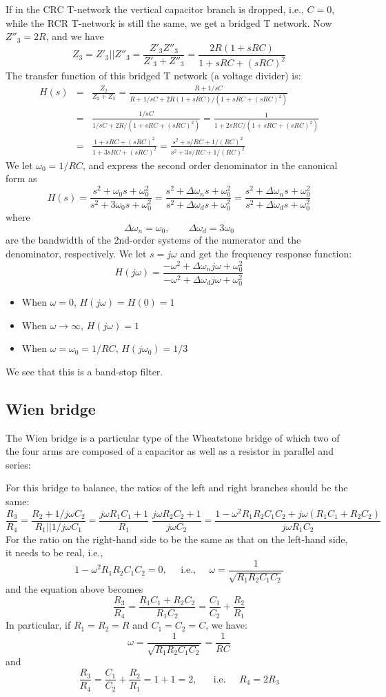 If in the CRC T-network the vertical capacitor branch is dropped, i.e.,
$C=0$, while the RCR T-network is still the same, we get a bridged T 
network. Now $Z''_3=2R$, and we have
\[
  Z_3=Z'_3||Z''_3=\frac{Z'_3 Z''_3}{Z'_3+Z''_3}
  =\frac{2R(1+sRC)}{1+sRC+(sRC)^2}
\]
The transfer function of this bridged T network (a voltage divider) is:
\begin{eqnarray}
H(s)&=&\frac{Z_2}{Z_2+Z_3}=\frac{R+1/sC}{R+1/sC+2R(1+sRC)/(1+sRC+(sRC)^2)}
\nonumber \\
&=&\frac{1/sC}{1/sC+2R/(1+sRC+(sRC)^2)}
=\frac{1}{1+2sRC/(1+sRC+(sRC)^2)}
\nonumber \\
&=&\frac{1+sRC+(sRC)^2}{1+3sRC+(sRC)^2}
=\frac{s^2+s/RC+1/(RC)^2}{s^2+3s/RC+1/(RC)^2}
\nonumber
\end{eqnarray}
We let $\omega_0=1/RC$, and express the second order denominator in the
canonical form as
\[
H(s)=\frac{s^2+\omega_0 s+\omega_0^2}{s^2+3\omega_0s+\omega_0^2}
=\frac{s^2+\Delta\omega_n s+\omega_0^2}{s^2+\Delta\omega_ds+\omega_0^2}
=\frac{s^2+\Delta\omega_n s+\omega_0^2}{s^2+\Delta\omega_ds+\omega_0^2}
\]
where 
\[
\Delta\omega_n=\omega_0,\;\;\;\;\;\;\;\Delta\omega_d=3\omega_0
\]
are the bandwidth of the 2nd-order systems of the numerator and the
denominator, respectively.
We let $s=j\omega$ and get the frequency response function:
\[
H(j\omega)=\frac{-\omega^2+\Delta\omega_n j\omega+\omega_0^2}{-\omega^2+\Delta\omega_dj\omega+\omega_0^2}
\]
\begin{itemize}
\item When $\omega=0$, $H(j\omega)=H(0)=1$
\item When $\omega\rightarrow \infty$, $H(j\omega)=1$
\item When $\omega=\omega_0=1/RC$, $H(j\omega_0)=1/3$
\end{itemize}
We see that this is a band-stop filter.


\subsection*{Wien bridge}


The Wien bridge is a particular type of the Wheatstone bridge of which
two of the four arms are composed of a capacitor as well as a resistor
in parallel and series:


For this bridge to balance, the ratios of the left and right branches
should be the same:
\[
\frac{R_3}{R_4}=\frac{R_2+1/j\omega C_2}{R_1||1/j\omega C_1}
=\frac{j\omega R_1C_1+1}{R_1}\;
\frac{j\omega R_2C_2+1}{j\omega C_2}
=\frac{1-\omega^2R_1R_2C_1C_2+j\omega(R_1C_1+R_2C_2)}{j\omega R_1C_2}
\]
For the ratio on the right-hand side to be the same as that on the
left-hand side, it needs to be real, i.e.,
\[
1-\omega^2R_1R_2C_1C_2=0,\;\;\;\;\;\mbox{i.e.,}\;\;\;\;\;
\omega=\frac{1}{\sqrt{R_1R_2C_1C_2}}
\]
and the equation above becomes
\[
\frac{R_3}{R_4}=\frac{R_1C_1+R_2C_2}{R_1C_2}=\frac{C_1}{C_2}+\frac{R_2}{R_1}
\]
In particular, if $R_1=R_2=R$ and $C_1=C_2=C$, we have:
\[
\omega=\frac{1}{\sqrt{R_1R_2C_1C_2}}=\frac{1}{RC}
\]
and
\[
\frac{R_3}{R_4}=\frac{C_1}{C_2}+\frac{R_2}{R_1}=1+1=2,
\;\;\;\;\;\;\mbox{i.e.}\;\;\;\;\;R_4=2R_3
\]

